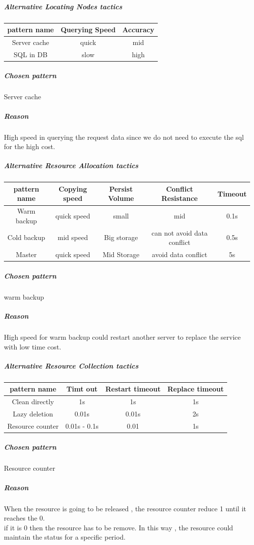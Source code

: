 \documentclass{article}
\begin{document}
					\subparagraph{Alternative Locating Nodes tactics}
					\begin{center}
						\begin{tabular}{|c|c|c|}
							\hline
							pattern name & Querying Speed & Accuracy\\
							\hline
							Server cache & quick & mid\\
							\hline
							SQL in DB & slow & high\\
							\hline
						\end{tabular}
					\end{center}
					\subparagraph{Chosen pattern} 
					Server cache
					\subparagraph{Reason} 
					High speed in querying the request data since we do not need to execute the sql for the high cost.

					\subparagraph{Alternative Resource Allocation tactics}
					\begin{center}
						\begin{tabular}{|c|c|c|c|c|}
							\hline
							pattern name & Copying speed & Persist Volume & Conflict Resistance & Timeout\\
							\hline
							Warm backup & quick speed & small & mid & 0.1s\\
							\hline
							Cold backup & mid speed & Big storage & can not avoid data conflict & 0.5s\\
							\hline
							Master	& quick speed & Mid Storage & avoid data conflict & 5s\\
							\hline
						\end{tabular}
					\end{center}
					\subparagraph{Chosen pattern} 
					warm backup
					\subparagraph{Reason} 
					High speed for warm backup could restart another server to replace the service with low time cost.

					\subparagraph{Alternative Resource Collection tactics}
					\begin{center}
						\begin{tabular}{|c|c|c|c|}
							\hline
							pattern name & Timt out & Restart timeout & Replace timeout\\
							\hline
							Clean directly & 1s & 1s & 1s\\
							\hline
							Lazy deletion & 0.01s & 0.01s & 2s\\
							\hline
							Resource counter & 0.01s - 0.1s & 0.01 & 1s \\
							\hline
						\end{tabular}
					\end{center}
					\subparagraph{Chosen pattern} 
					Resource counter
					\subparagraph{Reason} 
					When the resource is going to be released , the resource counter reduce 1 until it reaches the 0.\\
					if it is 0 then the resource has to be remove. In this way , the resource could maintain the status for a specific period.
				
\end{document}
